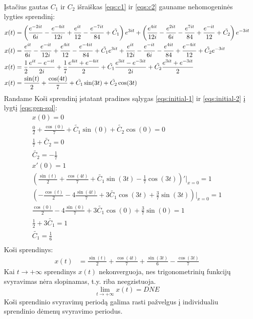 \documentclass[11pt]{article}
\begin{document}
Įstačius gautas $C_1$ ir $C_2$ išraiškas \eqref{eqs:c1} ir \eqref{eqs:c2} gauname nehomogeninės lygties sprendinį:
\begin{align}
x(t)&=\left(\frac{e^{-2it}}{6i}-\frac{e^{-4it}}{12i}+\frac{e^{it}}{12}-\frac{e^{-7it}}{84}+\tilde{C_1}\right)e^{3it}
+\left(\frac{e^{4it}}{12i}-\frac{e^{2it}}{6i}-\frac{e^{7it}}{84}+\frac{e^{-it}}{12}+\tilde{C_2}\right)e^{-3it}\notag\\
x(t)&=\frac{e^{it}}{6i}-\frac{e^{-it}}{12i}+\frac{e^{4it}}{12}-\frac{e^{-4it}}{84}+\tilde{C_1}e^{3it}
+\frac{e^{it}}{12i}-\frac{e^{-it}}{6i}-\frac{e^{4it}}{84}+\frac{e^{-4it}}{12}+\tilde{C_2}e^{-3it}\notag\\
x(t)&=\frac{1}{2}\frac{e^{it}-e^{-it}}{2i}+\frac{1}{7}\frac{e^{4it}+e^{-4it}}{2}+\tilde{C_1}\frac{e^{3it}-e^{-3it}}{2i}+\tilde{C_2}\frac{e^{3it}+e^{-3it}}{2}\notag\\
x(t)&=\frac{\sin(t)}{2}+\frac{\cos(4t)}{7}+\tilde{C_1}\sin(3t)+\tilde{C_2}\cos(3t)\label{eqs:gen-sol}
\end{align}
Randame Koši sprendinį įstatant pradines sąlygas \eqref{eqs:initial-1} ir \eqref{eqs:initial-2} į lygtį \eqref{eqs:gen-sol}:
\begin{align*}
x(0)=0\\
\frac{0}{2}+\frac{\cos(0)}{7}+\tilde{C_1}\sin(0)+\tilde{C_2}\cos(0)=0\\
\frac{1}{7}+\tilde{C_2}=0\\
\tilde{C_2}=-\frac{1}{7}\\
x'(0)=1\\
\left(\frac{\sin(t)}{2}+\frac{\cos(4t)}{7}+\tilde{C_1}\sin(3t)-\frac{1}{7}\cos(3t)\right)'\Big\vert_{x=0}=1\\
\left(-\frac{\cos(t)}{2}-4\frac{\sin(4t)}{7}+3\tilde{C_1}\cos(3t)+\frac{3}{7}\sin(3t)\right)\Big\vert_{x=0}=1\\
\frac{\cos(0)}{2}-4\frac{\sin(0)}{7}+3\tilde{C_1}\cos(0)+\frac{3}{7}\sin(0)=1\\
\frac{1}{2}+3\tilde{C_1}=1\\
\tilde{C_1}=\frac{1}{6}\\
\end{align*}
Koši sprendinys:
\begin{align}
x(t)&=\frac{\sin(t)}{2}+\frac{\cos(4t)}{7}+\frac{\sin(3t)}{6}-\frac{\cos(3t)}{7}\label{eqs:cauchy-sol}
\end{align} 
Kai $t\to+\infty$ sprendinys $x(t)$ nekonverguoja, nes trigonometrinių funkcijų svyravimas 
nėra slopinamas, t.y. riba neegzistuoja.
$$\lim_{t\to+\infty}x(t)=DNE$$
Koši sprendinio svyravimų periodą galima rasti pažvelgus į individualiu sprendinio dėmenų svyravimo periodus.
\end{document}
